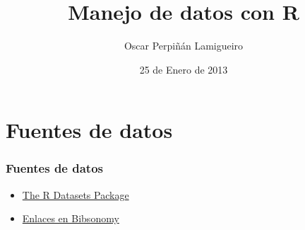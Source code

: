 \documentclass[xcolor={usenames,svgnames,dvipsnames}]{beamer}
\title{Manejo de datos con R}
\author{Oscar Perpiñán Lamigueiro}
\date{25 de Enero de 2013}
\begin{document}
\maketitle


\section{Fuentes de datos}
\label{sec-1}
\begin{frame}
\frametitle{Fuentes de datos}
\label{sec-1-1}


\begin{itemize}
\item \href{http://stat.ethz.ch/R-manual/R-patched/library/datasets/html/00Index.html}{The R Datasets Package}
\item \href{http://www.bibsonomy.org/user/procomun/data?resourcetype=bookmark}{Enlaces en Bibsonomy}
\end{itemize}
\end{frame}
\end{document}

